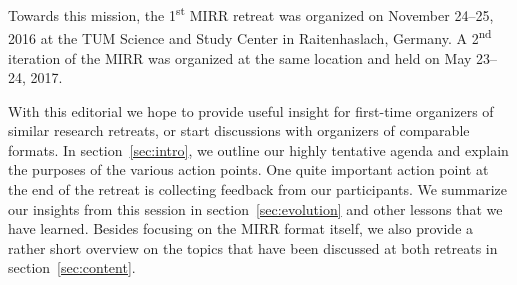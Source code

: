 Towards this mission, the 1\textsuperscript{st} \ac{MIRR} retreat was organized
on November 24--25, 2016 at the \ac{TUM} Science and Study Center in
Raitenhaslach, Germany\cite{raitenhaslach}. A 2\textsuperscript{nd} iteration of the \ac{MIRR} was organized at the same location and held on May 23--24, 2017.

With this editorial we hope to provide useful insight for first-time organizers of similar research retreats, or start discussions with organizers of comparable formats. In section~\ref{sec:intro}, we outline our highly tentative agenda and explain the purposes of the various action points. One quite important action point at the end of the retreat is collecting feedback from our participants. We summarize our insights from this session in section~\ref{sec:evolution} and other lessons that we have learned. Besides focusing on the \ac{MIRR} format itself, we also provide a rather short overview on the topics that have been discussed at both retreats in section~\ref{sec:content}.
